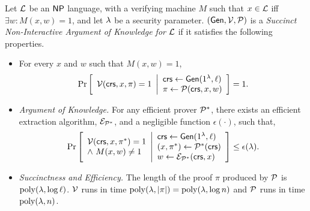 \begin{definition} \label{def:snarg}
Let $\mathcal{L}$ be an ${\mathsf{NP}}$ language, with a verifying machine $M$
such that $x \in \mathcal{L}$ iff $\exists w: M(x,w)=1$, and let $\lambda$ be a security parameter. $(\mathsf{Gen}, \mathcal{V}, \mathcal{P})$ is a \emph{Succinct Non-Interactive Argument of Knowledge for $\mathcal{L}$}
if it satisfies the following properties.
\vspace{-1ex}
\begin{itemize}
    \item For every $x$ and $w$ such that $M(x,w)=1$,
    \begin{gather*}
        \underset{}{\text{Pr}}\left [ 
        \begin{array}{ll}
        \mathcal{V}(\mathsf{crs}, x, \pi) = 1
        \end{array}
        \middle\vert
        \begin{array}{ll}
        \mathit{ \mathsf{crs} } \leftarrow \mathsf{Gen}(1^\lambda, \ell) \\
        \pi \leftarrow \mathcal{P}(\mathit{ \mathsf{crs} }, x, w) \\
        \end{array}
        \right ] = 1
	.
    \end{gather*}
    \item \emph{Argument of Knowledge.} For any efficient prover $\mathcal{P}^*$, there exists an efficient extraction algorithm, $\mathcal{E}_{\mathcal{P}^*}$,
and a negligible function $\epsilon(\cdot)$, such that,
    \begin{gather*}
        \underset{}{\text{Pr}}\left [
        \begin{array}{ll}
        \mathcal{V}(\mathit{ \mathsf{crs} }, x, \pi^*) = 1 \\
        \wedge\ M(x,w)\neq 1
        \end{array}
        \middle\vert
        \begin{array}{ll}
        \mathit{ \mathsf{crs} } \leftarrow \mathsf{Gen}(1^\lambda, \ell) \\
        (x, \pi^*) \leftarrow \mathcal{P}^*(\mathit{ \mathsf{crs} }) \\
        w\leftarrow \mathcal{E}_{\mathcal{P}^*}(\mathit{ \mathsf{crs} }, x)
        \end{array}
        \right ] \leq \epsilon(\lambda)
	.
    \end{gather*}
    \item \emph{Succinctness and Efficiency.} The length of the proof $\pi$ produced by $\mathcal{P}$ is $\operatorname{poly}(\lambda, \log \ell)$.
    $\mathcal{V}$ runs in time $\operatorname{poly}(\lambda, |\pi|) = \operatorname{poly}(\lambda, \log n)$
    and $\mathcal{P}$ runs in time $\operatorname{poly}(\lambda, n)$. 
\end{itemize}
\end{definition}
